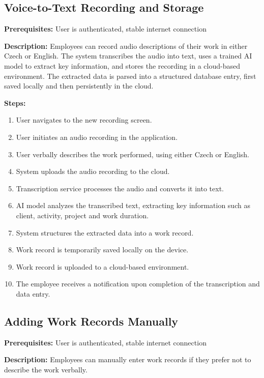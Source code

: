 \documentclass[
  digital,     %
  oneside,     %
  nosansbold,  %
  nocolorbold, %
  lof,         %
  lot,         %
]{fithesis4}
\begin{document}
\subsection{Voice-to-Text Recording and Storage}

\noindent \textbf{Prerequisites:} User is authenticated, stable internet connection

\noindent \textbf{Description:}  
Employees can record audio descriptions of their work in either Czech or English. The system transcribes the audio into text, uses a trained \gls{AI} model to extract key information, and stores the recording in a cloud-based environment. The extracted data is parsed into a structured database entry, first saved locally and then persistently in the cloud.

\noindent \textbf{Steps:}
\begin{enumerate}
    \item User navigates to the new recording screen.
    \item User initiates an audio recording in the application.
    \item User verbally describes the work performed, using either Czech or English.
    \item System uploads the audio recording to the cloud.
    \item Transcription service processes the audio and converts it into text.
    \item \gls{AI} model analyzes the transcribed text, extracting key information such as client, activity, project and work duration.
    \item System structures the extracted data into a work record.
    \item Work record is temporarily saved locally on the device.
    \item Work record is uploaded to a cloud-based environment.
    \item The employee receives a notification upon completion of the transcription and data entry.
\end{enumerate}

\subsection{Adding Work Records Manually}

\noindent \textbf{Prerequisites:} User is authenticated, stable internet connection

\noindent \textbf{Description:}  
Employees can manually enter work records if they prefer not to describe the work verbally.
\end{document}
